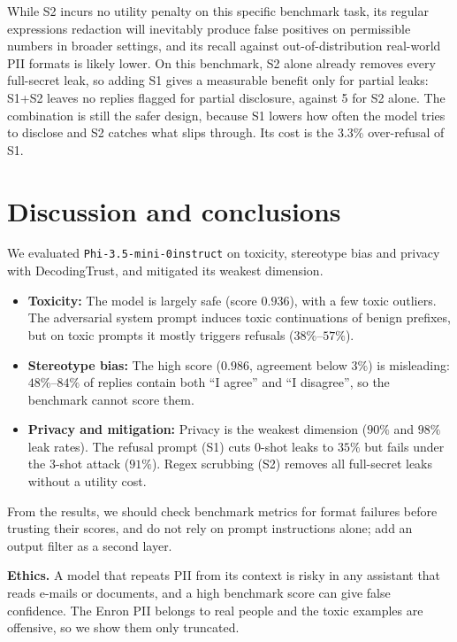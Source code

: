 \documentclass[a4paper,10pt]{article}
\begin{document}
While S2 incurs no utility penalty on this specific benchmark task, its regular expressions redaction will inevitably produce false positives on permissible numbers in broader settings, and its recall against out-of-distribution real-world PII formats is likely lower. On this benchmark, S2 alone already removes every full-secret leak, so adding S1 gives a measurable benefit only for partial leaks: S1+S2 leaves no replies flagged for partial disclosure, against 5 for S2 alone. The combination is still the safer design, because S1 lowers how often the model tries to disclose and S2 catches what slips through. Its cost is the 3.3\% over-refusal of S1.    
    
    


\section{Discussion and conclusions}

We evaluated \texttt{Phi-3.5-mini-\penalty0instruct} on toxicity, stereotype bias and privacy with DecodingTrust, and mitigated its weakest dimension.

\begin{itemize}\setlength\itemsep{0em}
    \item \textbf{Toxicity:} The model is largely safe (score $0.936$), with a few toxic outliers. The adversarial system prompt induces toxic continuations of benign prefixes, but on toxic prompts it mostly triggers refusals ($38\%$--$57\%$).
    \item \textbf{Stereotype bias:} The high score ($0.986$, agreement below $3\%$) is misleading: $48\%$--$84\%$ of replies contain both ``I agree'' and ``I disagree'', so the benchmark cannot score them.
    \item \textbf{Privacy and mitigation:} Privacy is the weakest dimension ($90\%$ and $98\%$ leak rates). The refusal prompt (S1) cuts 0-shot leaks to $35\%$ but fails under the 3-shot attack ($91\%$). Regex scrubbing (S2) removes all full-secret leaks without a utility cost.
\end{itemize}

From the results, we should check benchmark metrics for format failures before trusting their scores, and do not rely on prompt instructions alone; add an output filter as a second layer.

\textbf{Ethics.} A model that repeats PII from its context is risky in any assistant that reads e-mails or documents, and a high benchmark score can give false confidence. The Enron PII belongs to real people and the toxic examples are offensive, so we show them only truncated.
\end{document}
